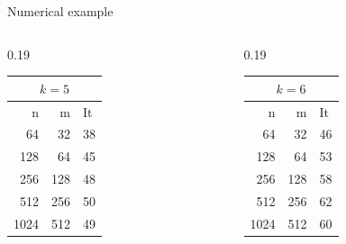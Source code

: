 \documentclass[aspectratio=169,xcolor=dvipsnames]{beamer}
\begin{document}
\begin{frame}{Numerical example}
\begin{columns}
\begin{column}{0.19\columnwidth}
\begin{tabular}{rrl}
	\toprule
	\multicolumn{3}{c}{$k=5$} \\
	\midrule 
	n & m & It \\
	\midrule 	
64 & 32 & 38 \\
128 & 64 & 45 \\
256 & 128 & 48 \\
512 & 256 & 50 \\
1024 & 512 & 49 \\
\bottomrule
\end{tabular}
\end{column}
\begin{column}{0.19\columnwidth}
\begin{tabular}{rrl}
	\toprule
	\multicolumn{3}{c}{$k=6$} \\
	\midrule 
	n & m & It \\
	\midrule 
64 & 32 & 46 \\
128 & 64 & 53 \\
256 & 128 & 58 \\
512 & 256 & 62 \\
1024 & 512 & 60 \\
\bottomrule
\end{tabular}
\end{column}
\end{columns}
\vfill


\end{frame}
\end{document}
